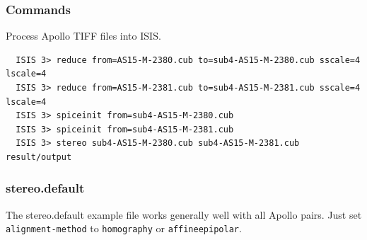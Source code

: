 \pagebreak

\subsubsection*{Commands}

Process Apollo TIFF files into \ac{ISIS}.
\begin{verbatim}
  ISIS 3> reduce from=AS15-M-2380.cub to=sub4-AS15-M-2380.cub sscale=4 lscale=4
  ISIS 3> reduce from=AS15-M-2381.cub to=sub4-AS15-M-2381.cub sscale=4 lscale=4
  ISIS 3> spiceinit from=sub4-AS15-M-2380.cub
  ISIS 3> spiceinit from=sub4-AS15-M-2381.cub
  ISIS 3> stereo sub4-AS15-M-2380.cub sub4-AS15-M-2381.cub result/output
\end{verbatim}

\subsubsection*{stereo.default}

The stereo.default example file works generally well with all Apollo
pairs. Just set \texttt{alignment-method} to \texttt{homography} or
\texttt{affineepipolar}.







